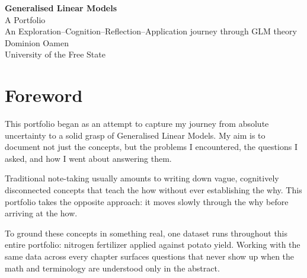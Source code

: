 \documentclass[11pt,a4paper,openany]{scrbook}
\begin{document}
\begin{titlepage}
\vspace*{4.6cm}
\begin{flushleft}
\hspace{0.2cm}
\begin{minipage}{0.9\textwidth}
{\sffamily\bfseries\huge\color{tealmain} Generalised Linear Models}\\[6pt]
{\sffamily\Large\color{amberacc} A Portfolio}\\[26pt]
{\sffamily\large\color{inkblack} An Exploration--Cognition--Reflection--Application journey through GLM theory}\\[60pt]
{\sffamily\color{greyline} Dominion Oamen}\\
{\sffamily\small\color{greyline} University of the Free State}
\end{minipage}
\end{flushleft}
\end{titlepage}

\frontmatter
\tableofcontents

\chapter*{Foreword}

This portfolio began as an attempt to capture my journey from absolute uncertainty to a solid grasp of Generalised Linear Models. My aim is to document not just the concepts, but the problems I encountered, the questions I asked, and how I went about answering them.

Traditional note-taking usually amounts to writing down vague, cognitively disconnected concepts that teach the how without ever establishing the why. This portfolio takes the opposite approach: it moves slowly through the why before arriving at the how.

To ground these concepts in something real, one dataset runs throughout this entire portfolio: nitrogen fertilizer applied against potato yield. Working with the same data across every chapter surfaces questions that never show up when the math and terminology are understood only in the abstract.
\end{document}
